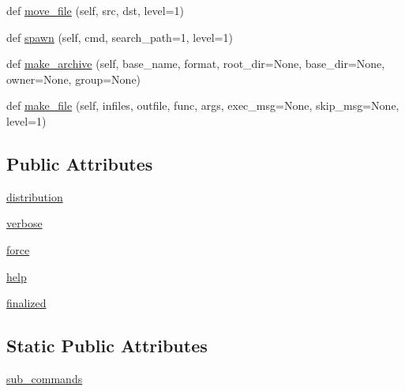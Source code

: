 \begin{DoxyCompactItemize}
\item 
def \hyperlink{classsetuptools_1_1__distutils_1_1cmd_1_1Command_adc307a1c47ff058dbf2df5b72945090e}{move\+\_\+file} (self, src, dst, level=1)
\item 
def \hyperlink{classsetuptools_1_1__distutils_1_1cmd_1_1Command_a65764cb2914106df8dd542a0c51f2539}{spawn} (self, cmd, search\+\_\+path=1, level=1)
\item 
def \hyperlink{classsetuptools_1_1__distutils_1_1cmd_1_1Command_a6acb52ef1168085b9eb6a02d739089e3}{make\+\_\+archive} (self, base\+\_\+name, format, root\+\_\+dir=None, base\+\_\+dir=None, owner=None, group=None)
\item 
def \hyperlink{classsetuptools_1_1__distutils_1_1cmd_1_1Command_ab3d3a89fe0d6c0aa4d8b92ef5c2dce66}{make\+\_\+file} (self, infiles, outfile, func, args, exec\+\_\+msg=None, skip\+\_\+msg=None, level=1)
\end{DoxyCompactItemize}
\subsection*{Public Attributes}
\begin{DoxyCompactItemize}
\item 
\hyperlink{classsetuptools_1_1__distutils_1_1cmd_1_1Command_a256a8934de40df1c414c8ab28c99bec4}{distribution}
\item 
\hyperlink{classsetuptools_1_1__distutils_1_1cmd_1_1Command_a6bfcaaf749a04fae018854b0a556b757}{verbose}
\item 
\hyperlink{classsetuptools_1_1__distutils_1_1cmd_1_1Command_aad077c0f828617990cebc881c4bdd358}{force}
\item 
\hyperlink{classsetuptools_1_1__distutils_1_1cmd_1_1Command_ac05bf925107099ae32d9594f518e2fef}{help}
\item 
\hyperlink{classsetuptools_1_1__distutils_1_1cmd_1_1Command_ad3882ac36037b173c5dd5bf1893497bb}{finalized}
\end{DoxyCompactItemize}
\subsection*{Static Public Attributes}
\begin{DoxyCompactItemize}
\item 
\hyperlink{classsetuptools_1_1__distutils_1_1cmd_1_1Command_a2e59ae735002de73f343fd52de3dc015}{sub\+\_\+commands}
\end{DoxyCompactItemize}


